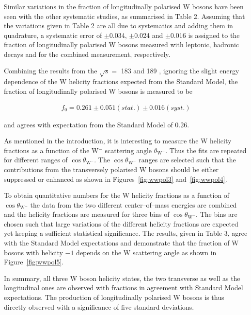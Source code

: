\documentclass[12pt,a4paper,dvips]{article}
\begin{document}
Similar variations in the fraction of 
longitudinally polarised W bosons have been seen with the other 
systematic studies, as summarised in Table 2.  
Assuming that the variations given in Table 
2 are all due to systematics and adding them in quadrature, 
a systematic error of $\pm$0.034, $\pm$0.024 and $\pm$0.016 
is assigned to the fraction of longitudinally 
polarised W bosons measured with leptonic, hadronic  
decays and for the combined measurement, respectively. 

Combining the results from the $\sqrt{s} =$ 183 \GeV{} and 189 \GeV{}, 
ignoring the slight energy dependence of the W helicity fractions
expected from the Standard Model, the fraction of longitudinally 
polarised W bosons is measured to be 

\begin{eqnarray}
f_{0} = 0.261 \pm 0.051(stat.) \pm 0.016(syst.) \nonumber
\end{eqnarray}

\noindent
and agrees with expectation from the Standard Model of 0.26.

As mentioned in the introduction, it is  
interesting to measure the W helicity fractions as a function of the 
W$^{-}$ scattering angle $\theta_{\mathrm{W}^{-}}$.
Thus the fits are repeated for different ranges of 
$\cos \theta_{\mathrm{W}^{-}}$.
The $\cos \theta_{\mathrm{W}^{-}}$ ranges are selected such that 
the contributions from the transversely polarised W bosons
should be either suppressed or enhanced 
as shown in Figures~\ref{fig:wwpol3} and~\ref{fig:wwpol4}.

To obtain quantitative numbers for the W helicity fractions 
as a function of $\cos \theta_{\mathrm{W}^{-}}$ 
the data from the two different center--of--mass energies 
are combined and the helicity fractions are measured 
for three bins of $\cos \theta_{\mathrm{W}^{-}}$.  
The bins are chosen such that large variations of the different 
helicity fractions are expected \cite{Hagiwara87} 
yet keeping a sufficient statistical significance.
The results, given in Table 3, agree with the Standard Model 
expectations and demonstrate that the fraction of 
W bosons with helicity $-1$ depends on the W scattering 
angle as shown in Figure~\ref{fig:wwpol5}.

In summary, all three W boson helicity states, 
the two transverse as well as the 
longitudinal ones are observed with fractions in agreement with 
Standard Model expectations.
The production of longitudinally polarised W bosons 
is thus directly observed with a significance of five standard deviations.
      
\end{document}
